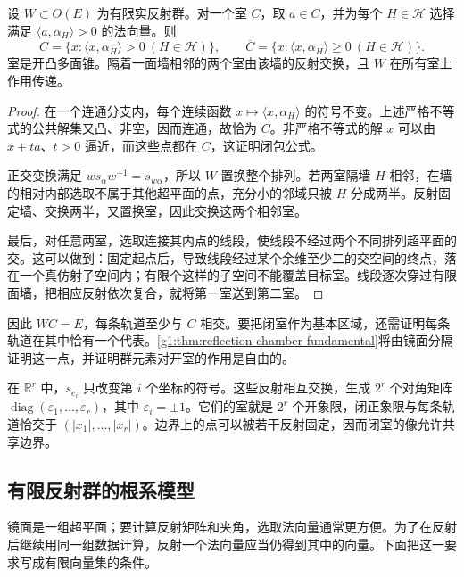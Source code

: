 \begin{proposition}\label{g1:prop:finite-reflection-chambers}
	设 \(W\subset O(E)\) 为有限实反射群。对一个室 \(C\)，取 \(a\in C\)，并为每个 \(H\in\mathcal H\) 选择满足 \(\langle a,\alpha_H\rangle>0\) 的法向量。则
	\[
		C=\{x:\langle x,\alpha_H\rangle>0\ (H\in\mathcal H)\},\qquad
		\overline C=\{x:\langle x,\alpha_H\rangle\ge0\ (H\in\mathcal H)\}.
	\]
	室是开凸多面锥。隔着一面墙相邻的两个室由该墙的反射交换，且 \(W\) 在所有室上作用传递。
\end{proposition}
\begin{proof}
	在一个连通分支内，每个连续函数 \(x\mapsto\langle x,\alpha_H\rangle\) 的符号不变。上述严格不等式的公共解集又凸、非空，因而连通，故恰为 \(C\)。非严格不等式的解 \(x\) 可以由 \(x+ta\)、\(t>0\) 逼近，而这些点都在 \(C\)，这证明闭包公式。

	正交变换满足 \(ws_\alpha w^{-1}=s_{w\alpha}\)，所以 \(W\) 置换整个排列。若两室隔墙 \(H\) 相邻，在墙的相对内部选取不属于其他超平面的点，充分小的邻域只被 \(H\) 分成两半。反射固定墙、交换两半，又置换室，因此交换这两个相邻室。

	最后，对任意两室，选取连接其内点的线段，使线段不经过两个不同排列超平面的交。这可以做到：固定起点后，导致线段经过某个余维至少二的交空间的终点，落在一个真仿射子空间内；有限个这样的子空间不能覆盖目标室。线段逐次穿过有限面墙，把相应反射依次复合，就将第一室送到第二室。
\end{proof}

因此 \(W\overline C=E\)，每条轨道至少与 \(\overline C\) 相交。要把闭室作为基本区域，还需证明每条轨道在其中恰有一个代表。\cref{g1:thm:reflection-chamber-fundamental}将由镜面分隔证明这一点，并证明群元素对开室的作用是自由的。

\begin{example}\label{g1:eg:coordinate-reflection-chambers}
	在 \(\mathbb R^r\) 中，\(s_{e_i}\) 只改变第 \(i\) 个坐标的符号。这些反射相互交换，生成 \(2^r\) 个对角矩阵 \(\operatorname{diag}(\varepsilon_1,\ldots,\varepsilon_r)\)，其中 \(\varepsilon_i=\pm1\)。它们的室就是 \(2^r\) 个开象限，闭正象限与每条轨道恰交于 \((|x_1|,\ldots,|x_r|)\)。边界上的点可以被若干反射固定，因而闭室的像允许共享边界。
\end{example}

\subsection{有限反射群的根系模型}
\label{g1:subsec:E01:02}

镜面是一组超平面；要计算反射矩阵和夹角，选取法向量通常更方便。为了在反射后继续用同一组数据计算，反射一个法向量应当仍得到其中的向量。下面把这一要求写成有限向量集的条件。

